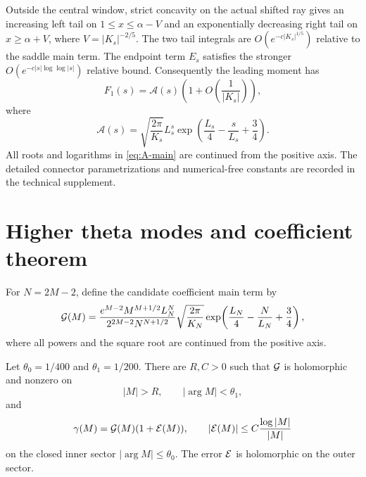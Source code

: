 \documentclass[12pt]{article}
\begin{document}
Outside the central window, strict concavity on the actual shifted ray gives
an increasing left tail on $1\le x\le\alpha-V$ and an exponentially
decreasing right tail on $x\ge\alpha+V$, where $V=|K_s|^{-2/5}$.  The two
tail integrals are $O(e^{-c|K_s|^{1/5}})$ relative to the saddle main term.
The endpoint term $E_s$ satisfies the stronger
$O(e^{-c|s|\log\log|s|})$ relative bound.  Consequently the leading moment has
\begin{equation}\label{eq:leading-moment}
 F_1(s)=\mathcal A(s)
 \left(1+O\left(\frac1{|K_s|}\right)\right),
\end{equation}
where
\begin{equation}\label{eq:A-main}
 \mathcal A(s)=\sqrt{\frac{2\pi}{K_s}}L_s^s
 \exp\!\left(\frac{L_s}{4}-\frac{s}{L_s}+\frac34\right).
\end{equation}
All roots and logarithms in \eqref{eq:A-main} are continued from the positive
axis.  The detailed connector parametrizations and numerical-free constants
are recorded in the technical supplement.

\section{Higher theta modes and coefficient theorem}\label{sec:coefficient}

For $N=2M-2$, define the candidate coefficient main term by
\begin{equation}\label{eq:G-main}
 \mathcal G(M)=
 \frac{e^{M-2}M^{M+1/2}L_N^N}
 {2^{2M-2}N^{N+1/2}}
 \sqrt{\frac{2\pi}{K_N}}
 \exp\!\left(\frac{L_N}{4}-\frac{N}{L_N}+\frac34\right),
\end{equation}
where all powers and the square root are continued from the positive axis.

\begin{theorem}\label{thm:sector}
Let $\theta_0=1/400$ and $\theta_1=1/200$.  There are $R,C>0$ such that
$\mathcal G$ is holomorphic and nonzero on
\[
 |M|>R,\qquad |\arg M|<\theta_1,
\]
and
\begin{equation}\label{eq:sector-asymptotic}
 \gamma(M)=\mathcal G(M)(1+\mathcal E(M)),
 \qquad
 |\mathcal E(M)|\le C\frac{\log|M|}{|M|}
\end{equation}
on the closed inner sector $|\arg M|\le\theta_0$.
The error $\mathcal E$ is holomorphic on the outer sector.
\end{theorem}
\end{document}
